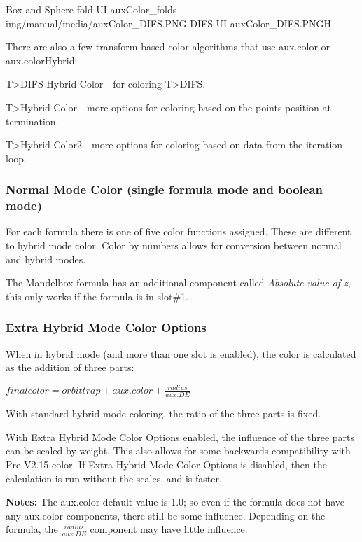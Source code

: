 {Box and Sphere fold UI}
{auxColor_folds}
{img/manual/media/auxColor_DIFS.PNG}
{DIFS UI}
{auxColor_DIFS.PNG}{H}

There are also a few transform-based color algorithms that use aux.color or aux.colorHybrid:

T>DIFS Hybrid Color - for coloring T>DIFS.

T>Hybrid Color - more options for coloring based on the points position at termination.

T>Hybrid Color2 - more options for coloring based on data from the iteration loop.

\subsubsection{Normal Mode Color (single formula mode and boolean mode)}\label{materials-normal-mode-color}

For each formula there is one of five color functions assigned.
These are different to hybrid mode color. Color by numbers allows for conversion between normal and hybrid modes.

The Mandelbox formula has an additional component called \emph{Absolute value of z}, this only works if the formula is in slot\#1.


\subsubsection{Extra Hybrid Mode Color Options}\label{materials-extra-hybrid-mode-color-options}

When in hybrid mode (and more than one slot is enabled), the color is calculated as the addition of three parts:

\(final color = orbit trap  +  aux.color  +  \frac{radius}{aux.DE}\)

With standard hybrid mode coloring, the ratio of the three parts is fixed.

With Extra Hybrid Mode Color Options enabled, the influence of the three parts can be scaled by weight. This also allows for some backwards compatibility with Pre V2.15 color. If Extra Hybrid Mode Color Options is disabled, then the calculation is run without the scales, and is faster.

\textbf{Notes: }The aux.color default value is 1.0; so even if the formula does not have any aux.color components, there still be some influence. Depending on the formula, the \(\frac{radius}{aux.DE}\) component may have little influence.

